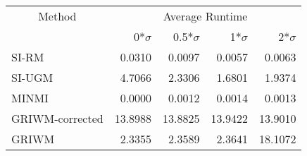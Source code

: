 
\begin{tabular}{lrrrr}
\toprule
\multicolumn{1}{c}{Method} & \multicolumn{4}{c}{Average Runtime} \\
 & 0*$\sigma$ & 0.5*$\sigma$ & 1*$\sigma$ & 2*$\sigma$\\
\midrule
SI-RM & 0.0310 & 0.0097 & 0.0057 & 0.0063\\
SI-UGM & 4.7066 & 2.3306 & 1.6801 & 1.9374\\
MINMI & 0.0000 & 0.0012 & 0.0014 & 0.0013\\
GRIWM-corrected & 13.8988 & 13.8825 & 13.9422 & 13.9010\\
GRIWM & 2.3355 & 2.3589 & 2.3641 & 18.1072\\
\bottomrule
\end{tabular}
